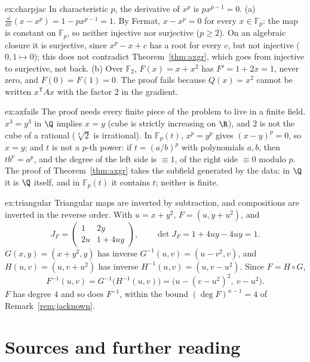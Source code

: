 \begin{solution}{ex:charpjac}
\idea In characteristic $p$, the derivative of $x^p$ is $px^{p-1}=0$.
\writeup (a) $\frac{\dd}{\dd x}(x-x^p)=1-px^{p-1}=1$. By Fermat, $x-x^p=0$ for every $x\in\mathbb F_p$: the map is constant on $\mathbb F_p$, so neither injective
nor surjective ($p\ge2$). On an algebraic closure it is surjective, since $x^p-x+c$ has a root for every $c$, but not injective ($0,1\mapsto0$); this does
not contradict Theorem~\ref{thm:axgr}, which goes from injective to surjective, not back. (b) Over $\mathbb F_2$, $F(x)=x+x^2$ has $F'=1+2x=1$, never zero,
and $F(0)=F(1)=0$. The proof fails because $Q(x)=x^2$ cannot be written $x^{\mathsf T}Ax$ with the factor $2$ in the gradient.
\end{solution}

\begin{solution}{ex:axfails}
\idea The proof needs every finite piece of the problem to live in a finite field.
\writeup $x^3=y^3$ in $\Q$ implies $x=y$ (cube is strictly increasing on $\R$), and $2$ is not the cube of a rational ($\sqrt[3]2$ is irrational). In
$\mathbb F_p(t)$, $x^p=y^p$ gives $(x-y)^p=0$, so $x=y$; and $t$ is not a $p$-th power: if $t=(a/b)^p$ with polynomials $a,b$, then $tb^p=a^p$, and the
degree of the left side is $\equiv1$, of the right side $\equiv0$ modulo $p$. The proof of Theorem~\ref{thm:axgr} takes the subfield generated by the data:
in $\Q$ it is $\Q$ itself, and in $\mathbb F_p(t)$ it contains $t$; neither is finite.
\end{solution}

\begin{solution}{ex:triangular}
\idea Triangular maps are inverted by subtraction, and compositions are inverted in the reverse order.
\writeup With $u=x+y^2$, $F=(u,y+u^2)$, and
\[
J_F=\begin{pmatrix}1&2y\\2u&1+4uy\end{pmatrix},\qquad\det J_F=1+4uy-4uy=1.
\]
$G(x,y)=(x+y^2,y)$ has inverse $G^{-1}(u,v)=(u-v^2,v)$, and $H(u,v)=(u,v+u^2)$ has inverse $H^{-1}(u,v)=(u,v-u^2)$. Since $F=H\circ G$,
\[
F^{-1}(u,v)=G^{-1}\bigl(H^{-1}(u,v)\bigr)=\bigl(u-(v-u^2)^2,\ v-u^2\bigr).
\]
$F$ has degree $4$ and so does $F^{-1}$, within the bound $(\deg F)^{n-1}=4$ of Remark~\ref{rem:jacknown}.
\end{solution}

\section*{Sources and further reading}

